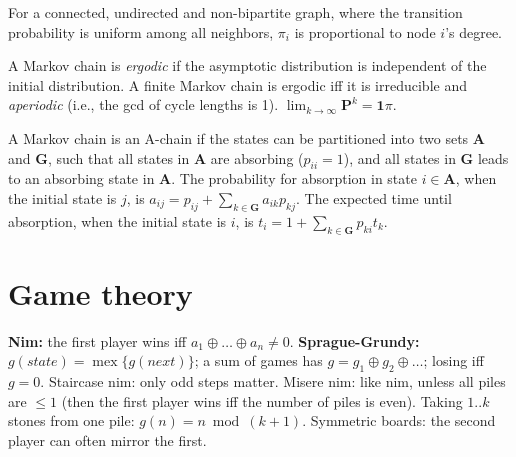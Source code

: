 For a connected, undirected and non-bipartite graph, where the transition probability is uniform among all neighbors, $\pi_i$ is proportional to node $i$'s degree.

A Markov chain is \emph{ergodic} if the asymptotic distribution is independent of the initial distribution.
A finite Markov chain is ergodic iff it is irreducible and \emph{aperiodic} (i.e., the gcd of cycle lengths is 1).
$\lim_{k\rightarrow\infty}\mathbf{P}^k = \mathbf{1}\pi$.

A Markov chain is an A-chain if the states can be partitioned into two sets $\mathbf{A}$ and $\mathbf{G}$, such that all states in $\mathbf{A}$ are absorbing ($p_{ii}=1$), and all states in $\mathbf{G}$ leads to an absorbing state in $\mathbf{A}$.
The probability for absorption in state $i\in\mathbf{A}$, when the initial state is $j$, is $a_{ij} = p_{ij}+\sum_{k\in\mathbf{G}} a_{ik}p_{kj}$.
The expected time until absorption, when the initial state is $i$, is $t_i = 1+\sum_{k\in\mathbf{G}}p_{ki}t_k$.

\section{Game theory}
\textbf{Nim:} the first player wins iff $a_1 \oplus \dots \oplus a_n \ne 0$.
\textbf{Sprague-Grundy:} $g(state) = \operatorname{mex}\{g(next)\}$; a sum of games
has $g = g_1 \oplus g_2 \oplus \dots$; losing iff $g = 0$.
Staircase nim: only odd steps matter. Misere nim: like nim, unless all piles are
$\le 1$ (then the first player wins iff the number of piles is even).
Taking $1..k$ stones from one pile: $g(n) = n \bmod (k+1)$.
Symmetric boards: the second player can often mirror the first.
